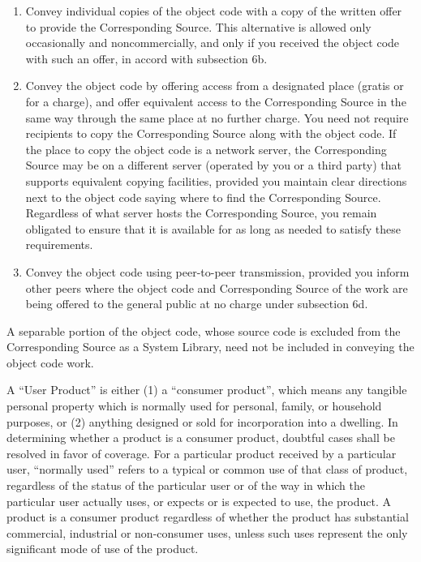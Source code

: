 \documentclass[10pt,a4paper,ngerman,titlepage,tocindentauto]{article}
\begin{document}
\begin{multicols}{3}
{\begin{enumerate}
\begin{enumerate}
						  \item Convey individual copies of the object code with a copy of the
						  written offer to provide the Corresponding Source.  This
						  alternative is allowed only occasionally and noncommercially, and
						  only if you received the object code with such an offer, in accord
						  with subsection 6b.

						  \item Convey the object code by offering access from a designated
						  place (gratis or for a charge), and offer equivalent access to the
						  Corresponding Source in the same way through the same place at no
						  further charge.  You need not require recipients to copy the
						  Corresponding Source along with the object code.  If the place to
						  copy the object code is a network server, the Corresponding Source
						  may be on a different server (operated by you or a third party)
						  that supports equivalent copying facilities, provided you maintain
						  clear directions next to the object code saying where to find the
						  Corresponding Source.  Regardless of what server hosts the
						  Corresponding Source, you remain obligated to ensure that it is
						  available for as long as needed to satisfy these requirements.

						  \item Convey the object code using peer-to-peer transmission, provided
						  you inform other peers where the object code and Corresponding
						  Source of the work are being offered to the general public at no
						  charge under subsection 6d.
						  \end{enumerate}

						A separable portion of the object code, whose source code is excluded
						from the Corresponding Source as a System Library, need not be
						included in conveying the object code work.

						A ``User Product'' is either (1) a ``consumer product'', which means any
						tangible personal property which is normally used for personal, family,
						or household purposes, or (2) anything designed or sold for incorporation
						into a dwelling.  In determining whether a product is a consumer product,
						doubtful cases shall be resolved in favor of coverage.  For a particular
						product received by a particular user, ``normally used'' refers to a
						typical or common use of that class of product, regardless of the status
						of the particular user or of the way in which the particular user
						actually uses, or expects or is expected to use, the product.  A product
						is a consumer product regardless of whether the product has substantial
						commercial, industrial or non-consumer uses, unless such uses represent
						the only significant mode of use of the product.


\end{enumerate}}
\end{multicols}
\end{document}
